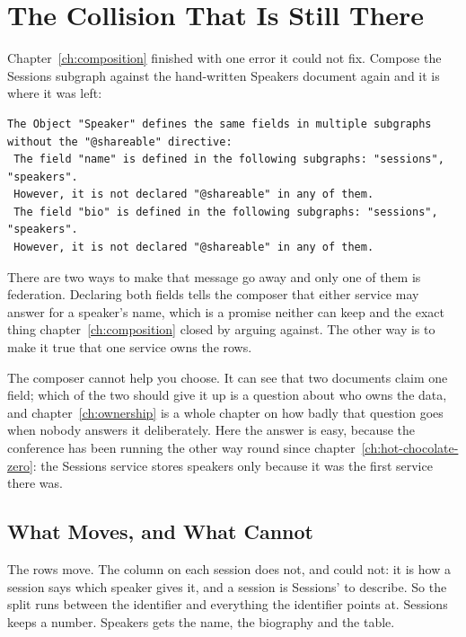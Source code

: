 \section{The Collision That Is Still There}
\label{sec:ch09-the-collision-that-is-still-there}

%
Chapter~\ref{ch:composition} finished with one error it could not fix.
Compose the Sessions subgraph against the hand-written Speakers document again
and it is where it was left:

\begin{verbatim}
The Object "Speaker" defines the same fields in multiple subgraphs without the "@shareable" directive:
 The field "name" is defined in the following subgraphs: "sessions", "speakers".
 However, it is not declared "@shareable" in any of them.
 The field "bio" is defined in the following subgraphs: "sessions", "speakers".
 However, it is not declared "@shareable" in any of them.
\end{verbatim}

%
There are two ways to make that message go away and only one of them is
federation. Declaring both fields  tells the composer that
either service may answer for a speaker's name, which is a promise neither can
keep and the exact thing chapter~\ref{ch:composition} closed by arguing
against. The other way is to make it true that one service owns the rows.

%
The composer cannot help you choose. It can see that two documents claim one
field; which of the two should give it up is a question about who owns the
data, and chapter~\ref{ch:ownership} is a whole chapter on how badly that
question goes when nobody answers it deliberately. Here the answer is easy,
because the conference has been running the other way round since
chapter~\ref{ch:hot-chocolate-zero}: the Sessions service stores speakers only
because it was the first service there was.

\subsection{What Moves, and What Cannot}

%
The rows move. The  column on each session does not, and could
not: it is how a session says which speaker gives it, and a session is
Sessions' to describe. So the split runs between the identifier and everything
the identifier points at. Sessions keeps a number. Speakers gets the name, the
biography and the table.

